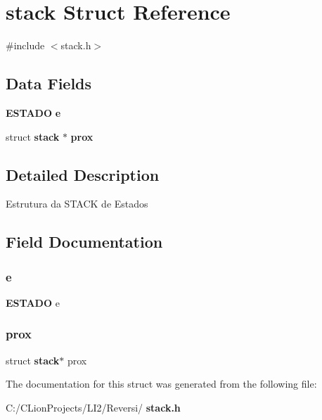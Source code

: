 \section{stack Struct Reference}
\label{structstack}


{\ttfamily \#include $<$stack.\+h$>$}

\subsection*{Data Fields}
\begin{DoxyCompactItemize}
\item 
\textbf{ E\+S\+T\+A\+DO} \textbf{ e}
\item 
struct \textbf{ stack} $\ast$ \textbf{ prox}
\end{DoxyCompactItemize}


\subsection{Detailed Description}
Estrutura da S\+T\+A\+CK de Estados 

\subsection{Field Documentation}
\mbox{\label{structstack_a16c51a92277e0711269fe818d6a8efa3}} 
\subsubsection{e}
{\footnotesize\ttfamily \textbf{ E\+S\+T\+A\+DO} e}

\mbox{\label{structstack_a2fefb1121834d5e38a3c9850679fd6ee}} 
\subsubsection{prox}
{\footnotesize\ttfamily struct \textbf{ stack}$\ast$ prox}



The documentation for this struct was generated from the following file\+:\begin{DoxyCompactItemize}
\item 
C\+:/\+C\+Lion\+Projects/\+L\+I2/\+Reversi/\textbf{ stack.\+h}\end{DoxyCompactItemize}
